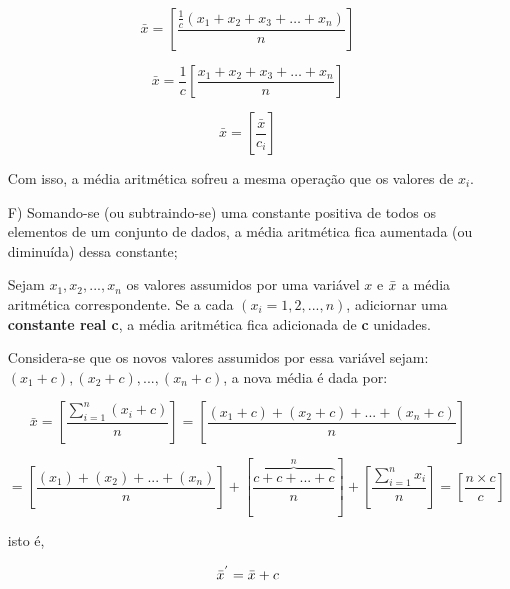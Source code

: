 \begin{enumerate}
\begin{equation*}\label{media3}
     \bar{x}= \left[ \frac{ \frac{1}{c} \left( x_{1}+x_{2}+x_{3}+\ldots+x_{n} \right)}{n} \right]
\end{equation*}

\begin{equation*}\label{media3}
     \bar{x}= \frac{1}{c} \left[ \frac{x_{1}+x_{2}+x_{3}+\ldots+x_{n}}{n} \right]
\end{equation*}

\begin{equation*}\label{media3}
     \bar{x}= \left[ \frac{\bar{x}}{c_{i}} \right]
\end{equation*}

Com isso, a média aritmética sofreu a mesma operação que os valores de $x_{i}$.

\newpage
\item [{F)}] Somando-se (ou subtraindo-se) uma constante positiva de todos os elementos de um conjunto de dados, a média aritmética fica aumentada (ou diminuída) dessa constante;\vskip0.3cm


\textbf{} 
\vskip0.3cm

Sejam $x_{1}, x_{2},...,x_{n}$ os valores assumidos por uma variável $x$ e $\Bar{x}$ a média aritmética correspondente. Se a cada $(x_{i}=1,2,...,n)$, adiciornar uma \textbf{constante real c}, a média aritmética fica adicionada de \textbf{c} unidades.\vskip0.3cm

Considera-se que os novos valores assumidos por essa variável sejam: $(x_{1}+c),(x_{2}+c),...,(x_{n}+c)$, a nova média é dada por:

\begin{equation*}\label{media3}
     \bar{x} = \left[ \frac{\sum_{i=1}^{n}(x_{i}+c)}{n} \right] =  \left[  \frac{(x_{1}+c)+(x_{2}+c)+...+(x_{n}+c)}{n} \right]
\end{equation*}

\begin{equation*}\label{media4}
  = \left[ \frac{(x_{1})+(x_{2})+...+(x_{n})}{n} \right] +  \left[ \overbrace{\frac{c+c+...+c}{n}}^{n} \right]+ 
 \left[ \frac{\sum_{i=1}^{n}x_{i}}{n}\right] = \left[ \frac{n \times c}{c} \right]
\end{equation*}

isto é, 

$$\Bar{x}^{'}=\Bar{x}+c$$



\newpage
\textbf{} 
\vskip0.3cm


\end{enumerate}
